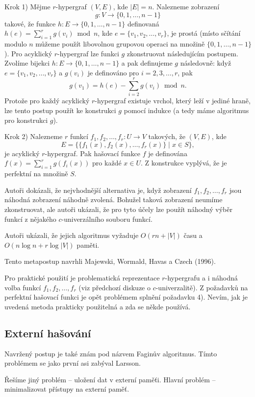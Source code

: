 \documentclass[a4paper,12pt]{article}
\begin{document}
Krok 1) Mějme $r$-hypergraf $(V,E)$, kde $|E|=n$.  Nalezneme 
zobrazení 
$$g:V\to \{0,1,\dots,n-1\}$$
takové, že funkce 
$h:E\to \{0,1,\dots,n-1\}$ definovaná $h(e)=\sum_{i=1}^rg(v_i)\bmod 
n$, 
kde $e=\{v_1,v_2,\dots,v_r\}$, je prostá (místo sčítání modulo $
n$ 
můžeme použít libovolnou grupovou operaci na 
množině $\{0,1,\dots,n-1\}$).  Pro acyklický $r$-hypergraf lze 
funkci $g$ zkonstruovat násle\-dujícím postupem.  Zvolíme 
bijekci $h:E\to \{0,1,\dots,n-1\}$ a pak definujeme $g$ 
následovně:  když $e=\{v_1,v_2,\dots,v_r\}$ a $g(v_i)$ je 
definováno pro $i=2,3,\dots,r$, pak 
$$g(v_1)=h(e)-\sum_{i=2}^rg(v_i)\bmod n.$$
Protože pro každý acyklický $r$-hypergraf existuje vrchol, který 
leží v jediné hraně, lze tento postup použít ke konstrukci $
g$ 
pomocí indukce (a tedy máme algoritmus pro konstrukci $g$).  

Krok 2) Nalezneme $r$ funkcí $f_1,f_2,\dots,f_r:U\to 
V$ takových, že 
$(V,E)$, kde 
$$E=\{\{f_1(x),f_2(x),\dots,f_r(x)\}\mid x\in S\},$$
 je acyklický 
$r$-hypergraf.  Pak hašovací funkce $f$ je definována 
$f(x)=\sum_{i=1}^rg(f_i(x))$ pro každé $x\in U$.  Z konstrukce 
vyplývá, že je perfektní na množině $S$.  

Autoři dokázali, že 
nejvhodnější alternativa je, když zobrazení $f_1
,f_2,\dots,f_r$ 
jsou náhodná zob\-razení náhodně zvolená. Bohu\-žel taková 
zobrazení neumíme zkonstruovat, ale autoři ukázali, že 
pro tyto účely lze použít náhodný výběr funkcí z 
nějakého $c$-univerzálního souboru funk\-cí. 

Autoři ukázali, že jejich algoritmus vyžaduje $
O(rn+|V|)$ 
času a $O(n\log n+r\log|V|)$ paměti. 

Tento metapostup navrhli Majewski, Wormald, Havas a Czech (1996).

Pro praktické použití je problematická 
reprezentace $r$-hyper\-gra\-fu a i náhodná volba funkcí 
$f_1,f_2,\dots,f_r$ (viz předchozí diskuze o $c$-univerzalitě).  Z 
požadavků na perfektní hašovací funkci je opět 
problémem splnění poža\-davku 4).  Nevím, jak je uvedená 
metoda prakticky pou\-ži\-telná a zda se někde používá.  

\subsection{Externí hašování}

Navržený postup je také znám pod názvem Faginův algoritmus. Tímto problémem se jako první asi zabýval Larsson.

Řešíme jiný problém -- uložení dat v externí 
paměťi. Hlavní problém -- minimalizovat přístupy na 
externí paměť. 
\end{document}
